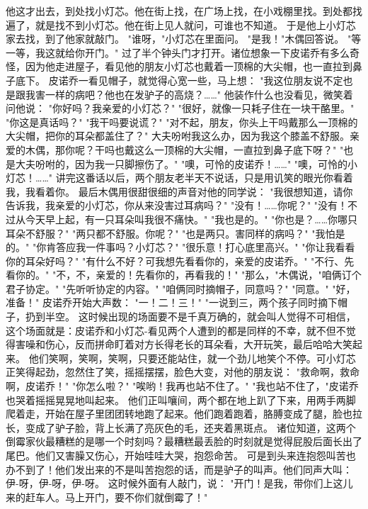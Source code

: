 \documentclass[12pt,UTF8]{ctexbook}
\begin{document}
他这才出去，到处找小灯芯。他在街上找，在广场上找，在小戏棚里找。到处都找遍了，就是找不到小灯芯。他在街上见人就问，可谁也不知道。
于是他上小灯芯家去找，到了他家就敲门。
"谁呀，"小灯芯在里面问。
"是我！"木偶回答说。
"等一等，我这就给你开门。"
过了半个钟头门才打开。诸位想象一下皮诺乔有多么奇怪，因为他走进屋子，看见他的朋友小灯芯也戴着一顶棉的大尖帽，也一直拉到鼻子底下。
皮诺乔一看见帽子，就觉得心宽一些，马上想：
"我这位朋友说不定也是跟我害一样的病吧？他也在发驴子的高烧？……"
他装作什么也没看见，微笑着问他说：
"你好吗？我亲爱的小灯芯？"
"很好，就像一只耗子住在一块干酪里。"
"你这是真话吗？"
"我干吗要说谎？"
"对不起，朋友，你头上干吗戴那么一顶棉的大尖帽，把你的耳朵都盖住了？"
大夫吩咐我这么办，因为我这个膝盖不舒服。亲爱的木偶，那你呢？干吗也戴这么一顶棉的大尖帽，一直拉到鼻子底下呀？"
"也是大夫吩咐的，因为我一只脚擦伤了。"
"噢，可怜的皮诺乔！……"
"噢，可怜的小灯芯！……"
讲完这番话以后，两个朋友老半天不说话，只是用讥笑的眼光你看着我，我看着你。
最后木偶用很甜很细的声音对他的同学说：
"我很想知道，请你告诉我，我亲爱的小灯芯，你从来没害过耳病吗？"
"没有！……你呢？"
"没有！不过从今天早上起，有一只耳朵叫我很不痛快。"
"我也是的。"
"你也是？……你哪只耳朵不舒服？"
"两只都不舒服。你呢？"
"也是两只。害同样的病吗？"
"我怕是的。"
"你肯答应我一件事吗？小灯芯？"
"很乐意！打心底里高兴。"
"你让我看看你的耳朵好吗？"
"有什么不好？可我想先看看你的，亲爱的皮诺乔。"
"不行、先看你的。"
"不，不，亲爱的！先看你的，再看我的！"
"那么，"木偶说，"咱俩订个君子协定。"
"先听听协定的内容。"
"咱俩同时摘帽子，同意吗？"
"同意。"
"好，准备！"
皮诺乔开始大声数：
"一！二！三！"
"一说到三，两个孩子同时摘下帽子，扔到半空。
这时候出现的场面要不是千真万确的，就会叫人觉得不可相信，这个场面就是：皮诺乔和小灯芯-看见两个人遭到的都是同样的不幸，就不但不觉得害噪和伤心，反而拼命盯着对方长得老长的耳朵看，大开玩笑，最后哈哈大笑起来。
他们笑啊，笑啊，笑啊，只要还能站住，就一个劲儿地笑个不停。可小灯芯正笑得起劲，忽然住了笑，摇摇摆摆，脸色大变，对他的朋友说：
"救命啊，救命啊，皮诺乔！"
"你怎么啦？"
"唉哟！我再也站不住了。"
"我也站不住了，"皮诺乔也哭着摇摇晃晃地叫起来。
他们正叫嚷间，两个都在地上趴了下来，用两手两脚爬着走，开始在屋子里团团转地跑了起来。他们跑着跑着，胳膊变成了腿，脸也拉长，变成了驴子脸，背上长满了亮灰色的毛，还夹着黑斑点。
诸位知道，这两个倒霉家伙最糟糕的是哪一个时刻吗？最糟糕最丢脸的时刻就是觉得屁股后面长出了尾巴。他们又害臊又伤心，开始哇哇大哭，抱怨命苦。
可是到头来连抱怨叫苦也办不到了！他们发出来的不是叫苦抱怨的话，而是驴子的叫声。他们同声大叫：伊-呀，伊-呀，伊-呀。
这时候外面有人敲门，说：
"开门！是我，带你们上这儿来的赶车人。马上开门，要不你们就倒霉了！"

\chapter{}
\end{document}
